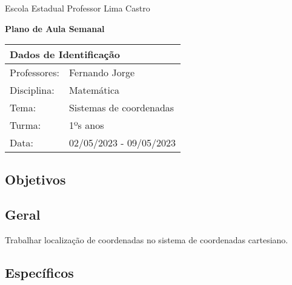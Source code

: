 \documentclass[oneside,a4paper,12pt]{article}
\newcommand{\universidade}{Escola Estadual Professor Lima Castro}
\newcommand{\professores}{Fernando Jorge}
\newcommand{\disciplina}{Matemática}
\newcommand{\tema}{Sistemas de coordenadas}
\newcommand{\turma}{1ºs anos}
\newcommand{\data}{02/05/2023 - 09/05/2023}
\begin{document}
  \pagestyle{empty}

	\begin{center}
	
	  \universidade
	  \par
	  \vspace{10pt}
	  \LARGE \textbf{Plano de Aula Semanal}

	\end{center}

  \vspace{10pt}

	\begin{tabular}{ |l|p{12cm}| }

	  \hline
	  \multicolumn{2}{|l|}{\textbf{Dados de Identificação}} \\
	  \hline
	  Professores:         &    \professores           \\
	  \hline
	  Disciplina:        &    \disciplina          \\
	  \hline
	  Tema:              &    \tema                \\
	  \hline
	  Turma:             &    \turma               \\
	  \hline
	  Data:              &    \data                \\
	  \hline

	\end{tabular}

  \begin{snugshade}
  \section{Objetivos} %
  \end{snugshade}
  
  \subsection{Geral} %

  Trabalhar localização de coordenadas no sistema de coordenadas cartesiano.
    
  \subsection{Específicos} %
    
\end{document}
